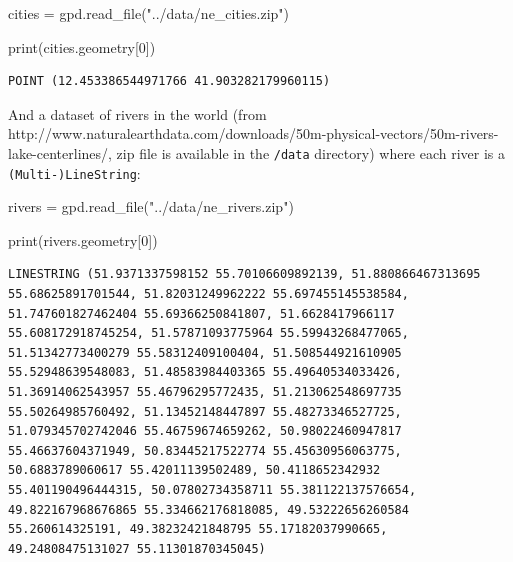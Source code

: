 \documentclass[
  letterpaper,
  DIV=11,
  numbers=noendperiod]{scrreprt}
\newenvironment{Shaded}{\begin{snugshade}}{\end{snugshade}}
\newcommand{\BuiltInTok}[1]{\textcolor[rgb]{0.00,0.23,0.31}{#1}}
\newcommand{\DecValTok}[1]{\textcolor[rgb]{0.68,0.00,0.00}{#1}}
\newcommand{\NormalTok}[1]{\textcolor[rgb]{0.00,0.23,0.31}{#1}}
\newcommand{\OperatorTok}[1]{\textcolor[rgb]{0.37,0.37,0.37}{#1}}
\newcommand{\StringTok}[1]{\textcolor[rgb]{0.13,0.47,0.30}{#1}}
\begin{document}
\begin{Shaded}
\begin{Highlighting}[]
\NormalTok{cities }\OperatorTok{=}\NormalTok{ gpd.read\_file(}\StringTok{"../data/ne\_cities.zip"}\NormalTok{)}
\end{Highlighting}
\end{Shaded}

\begin{Shaded}
\begin{Highlighting}[]
\BuiltInTok{print}\NormalTok{(cities.geometry[}\DecValTok{0}\NormalTok{])}
\end{Highlighting}
\end{Shaded}

\begin{verbatim}
POINT (12.453386544971766 41.903282179960115)
\end{verbatim}

And a dataset of rivers in the world (from
http://www.naturalearthdata.com/downloads/50m-physical-vectors/50m-rivers-lake-centerlines/,
zip file is available in the \texttt{/data} directory) where each river
is a \texttt{(Multi-)LineString}:

\begin{Shaded}
\begin{Highlighting}[]
\NormalTok{rivers }\OperatorTok{=}\NormalTok{ gpd.read\_file(}\StringTok{"../data/ne\_rivers.zip"}\NormalTok{)}
\end{Highlighting}
\end{Shaded}

\begin{Shaded}
\begin{Highlighting}[]
\BuiltInTok{print}\NormalTok{(rivers.geometry[}\DecValTok{0}\NormalTok{])}
\end{Highlighting}
\end{Shaded}

\begin{verbatim}
LINESTRING (51.9371337598152 55.70106609892139, 51.880866467313695 55.68625891701544, 51.82031249962222 55.697455145538584, 51.747601827462404 55.69366250841807, 51.6628417966117 55.608172918745254, 51.57871093775964 55.59943268477065, 51.51342773400279 55.58312409100404, 51.508544921610905 55.52948639548083, 51.48583984403365 55.49640534033426, 51.36914062543957 55.46796295772435, 51.213062548697735 55.50264985760492, 51.13452148447897 55.48273346527725, 51.079345702742046 55.46759674659262, 50.98022460947817 55.46637604371949, 50.83445217522774 55.45630956063775, 50.6883789060617 55.42011139502489, 50.4118652342932 55.401190496444315, 50.07802734358711 55.381122137576654, 49.822167968676865 55.334662176818085, 49.53222656260584 55.260614325191, 49.38232421848795 55.17182037990665, 49.24808475131027 55.11301870345045)
\end{verbatim}
\end{document}
